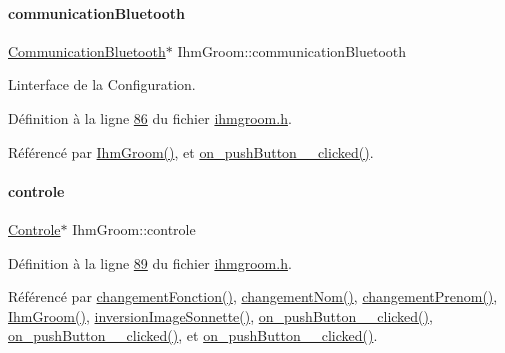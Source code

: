 \paragraph{\texorpdfstring{communication\+Bluetooth}{communicationBluetooth}}
{\footnotesize\ttfamily \hyperlink{class_communication_bluetooth}{Communication\+Bluetooth}$\ast$ Ihm\+Groom\+::communication\+Bluetooth\hspace{0.3cm}{\ttfamily [private]}}



L\textquotesingle{}interface de la Configuration. 



Définition à la ligne \hyperlink{ihmgroom_8h_source_l00086}{86} du fichier \hyperlink{ihmgroom_8h_source}{ihmgroom.\+h}.



Référencé par \hyperlink{ihmgroom_8cpp_source_l00031}{Ihm\+Groom()}, et \hyperlink{ihmgroom_8cpp_source_l00181}{on\+\_\+push\+Button\+\_\+\_\+clicked()}.

\mbox{\label{class_ihm_groom_acead732c303b50a3285bd311ac8a3b4f}} 
\paragraph{\texorpdfstring{controle}{controle}}
{\footnotesize\ttfamily \hyperlink{class_controle}{Controle}$\ast$ Ihm\+Groom\+::controle\hspace{0.3cm}{\ttfamily [private]}}



Définition à la ligne \hyperlink{ihmgroom_8h_source_l00089}{89} du fichier \hyperlink{ihmgroom_8h_source}{ihmgroom.\+h}.



Référencé par \hyperlink{ihmgroom_8cpp_source_l00075}{changement\+Fonction()}, \hyperlink{ihmgroom_8cpp_source_l00065}{changement\+Nom()}, \hyperlink{ihmgroom_8cpp_source_l00070}{changement\+Prenom()}, \hyperlink{ihmgroom_8cpp_source_l00031}{Ihm\+Groom()}, \hyperlink{ihmgroom_8cpp_source_l00201}{inversion\+Image\+Sonnette()}, \hyperlink{ihmgroom_8cpp_source_l00229}{on\+\_\+push\+Button\+\_\+\_\+clicked()}, \hyperlink{ihmgroom_8cpp_source_l00219}{on\+\_\+push\+Button\+\_\+\_\+clicked()}, et \hyperlink{ihmgroom_8cpp_source_l00224}{on\+\_\+push\+Button\+\_\+\_\+clicked()}.

\mbox{\label{class_ihm_groom_a95d2d2b4b3b849c1b21f234844fca056}} 
